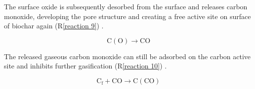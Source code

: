 The surface oxide is subsequently desorbed from the surface and releases carbon monoxide, developing the pore structure and creating a free active site on surface of biochar again (R\ref{reaction 9})  \cite{Sajjadi2019}. 

\begin{equation}
\mathrm{ C(O) \rightarrow CO}
\label{reaction 9}
\end{equation}

The released gaseous carbon monoxide can still be adsorbed on the carbon active site and inhibits further gasification (R\ref{reaction 10})  \cite{Sajjadi2019}.

\begin{equation}
\mathrm{ C_f +CO \rightarrow C(CO)}
\label{reaction 10}
\end{equation}

\vspace{0.3em}


\vspace{0.3em}



